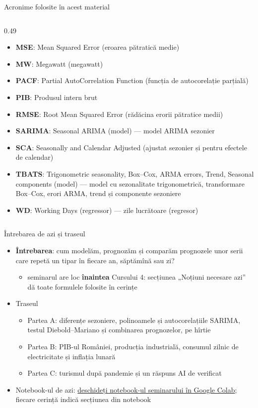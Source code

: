 \begin{frame}{Acronime folosite în acest material}
\begin{columns}[T]
\begin{column}{0.49\textwidth}
\begin{itemize}
    \item \textbf{MSE}: Mean Squared Error (eroarea pătratică medie)
    \item \textbf{MW}: Megawatt (megawatt)
    \item \textbf{PACF}: Partial AutoCorrelation Function (funcția de autocorelație parțială)
    \item \textbf{PIB}: Produsul intern brut
    \item \textbf{RMSE}: Root Mean Squared Error (rădăcina erorii pătratice medii)
    \item \textbf{SARIMA}: Seasonal ARIMA (model) — model ARIMA sezonier
    \item \textbf{SCA}: Seasonally and Calendar Adjusted (ajustat sezonier și pentru efectele de calendar)
    \item \textbf{TBATS}: Trigonometric seasonality, Box–Cox, ARMA errors, Trend, Seasonal components (model) — model cu sezonalitate trigonometrică, transformare Box–Cox, erori ARMA, trend și componente sezoniere
    \item \textbf{WD}: Working Days (regressor) — zile lucrătoare (regresor)
\end{itemize}
\end{column}
\end{columns}
\end{frame}

\begin{frame}{Întrebarea de azi și traseul}
\itemsize{\small}
\begin{itemize}
    \item \textbf{Întrebarea}: cum modelăm, prognozăm și comparăm prognozele unor serii care repetă un tipar în fiecare an, săptămînă sau zi?
    \begin{itemize}
        \item seminarul are loc \textbf{înaintea} Cursului 4: secțiunea „Noțiuni necesare azi” dă toate formulele folosite în cerințe
    \end{itemize}
    \item Traseul
    \begin{itemize}
        \item Partea A: diferențe sezoniere, polinoamele și autocorelațiile SARIMA, testul Diebold--Mariano și combinarea prognozelor, pe hîrtie
        \item Partea B: PIB-ul României, producția industrială, consumul zilnic de electricitate și inflația lunară
        \item Partea C: turismul după pandemie și un răspuns AI de verificat
    \end{itemize}
    \item Notebook-ul de azi: \href{\nb}{deschideți notebook-ul seminarului în Google Colab}; fiecare cerință indică secțiunea din notebook
\end{itemize}
\end{frame}


